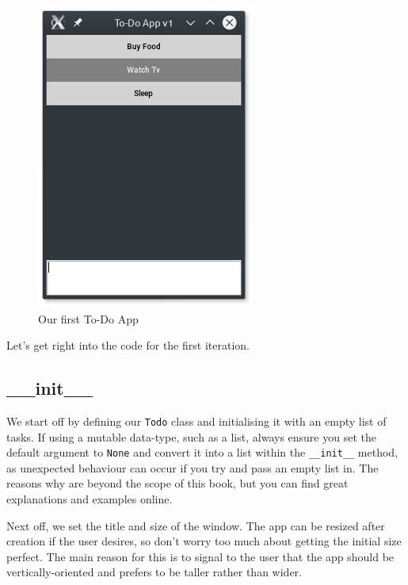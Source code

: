 \documentclass[a4paper,11pt,openany]{book}
\begin{document}
\begin{figure}[h]
\centering
\includegraphics{Ch2-1}
\caption{Our first To-Do App}
\end{figure}

\newpage

Let's get right into the code for the first iteration.



\subsection{\_\_init\_\_}

We start off by defining our \lstinline[columns=fixed]{Todo} class and initialising it with an empty list of tasks. If using a mutable data-type, such as a list, always ensure you set the default argument to \lstinline[columns=fixed]{None} and convert it into a list within the \lstinline[columns=fixed]{__init__} method, as unexpected behaviour can occur if you try and pass an empty list in. The reasons why are beyond the scope of this book, but you can find great explanations and examples online.

\vspace{5mm}

Next off, we set the title and size of the window. The app can be resized after creation if the user desires, so don't worry too much about getting the initial size perfect. The main reason for this is to signal to the user that the app should be vertically-oriented and prefers to be taller rather than wider. 
\end{document}
